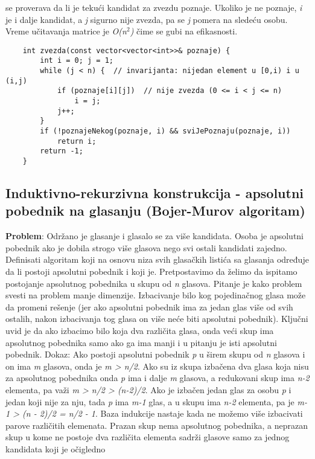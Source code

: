 \documentclass{article}
\begin{document}
se proverava da li je tekući kandidat za zvezdu poznaje. Ukoliko je ne poznaje, \textit{i} je i dalje kandidat, a \textit{j} sigurno nije zvezda, pa se \textit{j} pomera na sledeću osobu. 
Vreme učitavanja matrice je\textit{ O(n$^2$)} čime se gubi na efikasnosti.
\begin{lstlisting}
    int zvezda(const vector<vector<int>>& poznaje) {
        int i = 0; j = 1;
        while (j < n) {  // invarijanta: nijedan element u [0,i) i u (i,j) 
            if (poznaje[i][j])  // nije zvezda (0 <= i < j <= n)
                i = j;
            j++;
        }
        if (!poznajeNekog(poznaje, i) && sviJePoznaju(poznaje, i))
            return i;
        return -1;
    }
\end{lstlisting}

\subsection{Induktivno-rekurzivna konstrukcija - apsolutni pobednik na glasanju (Bojer-Murov algoritam)}
\textbf{Problem}: Održano je glasanje i glasalo se za više kandidata. Osoba je apsolutni
pobednik ako je dobila strogo više glasova nego svi ostali kandidati zajedno.
Definisati algoritam koji na osnovu niza svih glasačkih listića sa glasanja određuje
da li postoji apsolutni pobednik i koji je.
\newline Pretpostavimo da želimo da ispitamo postojanje apsolutnog pobednika u skupu
od \textit{n} glasova. Pitanje je kako problem svesti na problem manje dimenzije. Izbacivanje bilo kog pojedinačnog glasa može da promeni rešenje (jer ako apsolutni
pobednik ima za jedan glas više od svih ostalih, nakon izbacivanja tog glasa on
više neće biti apsolutni pobednik).
\newline Ključni uvid je da ako izbacimo bilo koja dva različita glasa, onda veći skup
ima apsolutnog pobednika samo ako ga ima manji i u pitanju je isti apsolutni
pobednik. Dokaz: Ako postoji apsolutni pobednik \textit{p} u širem
skupu od \textit{n} glasova i on ima \textit{m} glasova, onda je \textit{m > n/2}. Ako su iz skupa
izbačena dva glasa koja nisu za apsolutnog pobednika onda \textit{p} ima i dalje\textit{ m}
glasova, a redukovani skup ima \textit{n-2} elementa, pa važi \textit{m > n/2 > (n-2)/2}. Ako
je izbačen jedan glas za osobu \textit{p} i jedan koji nije za nju, tada \textit{p} ima \textit{m-1} glas, a
u skupu ima \textit{n-2} elementa, pa je \textit{m-1 > (n - 2)/2 = n/2 - 1}. Baza indukcije nastaje kada ne možemo više izbacivati parove različitih elemenata.
Prazan skup nema apsolutnog pobednika, a neprazan skup u kome ne postoje dva različita elementa sadrži glasove samo za jednog kandidata koji je očigledno
\end{document}
